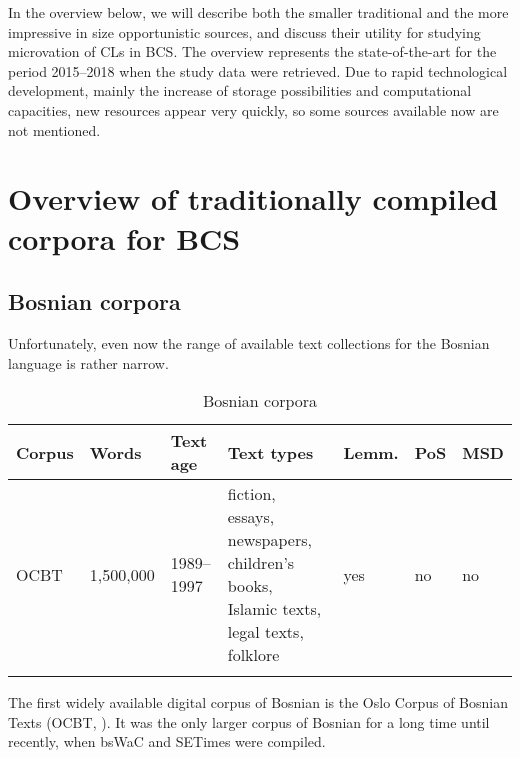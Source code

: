 In the overview below, we will describe both the smaller traditional and the more impressive in size opportunistic sources, and discuss their utility for studying microvation of CLs in BCS. The overview represents the state-of-the-art for the period 2015--2018 when the study data were retrieved. Due to rapid technological development, mainly the increase of storage possibilities and computational capacities, new resources appear very quickly, so some sources available now are not mentioned.

\section{Overview of traditionally compiled corpora for BCS}
\label{Overview of traditionally compiled corpora for BCS}
\subsection{Bosnian corpora}

Unfortunately, even now the range of available text collections for the Bosnian language is rather narrow. 

\begin{table}
\caption{Bosnian corpora}
\label{table:bos1}
\centering
\begin{tabularx}{.97\textwidth}{lll>{\raggedright\arraybackslash}Xlll}
\lsptoprule
Corpus	&	Words		&	Text age	&	Text types												&	Lemm.		&	PoS	&	MSD \\
\midrule
OCBT		&	1,500,000	&	1989--1997		&fiction, essays, newspapers, children's books, Islamic texts, legal texts, folklore 	&	yes	&	no	&	no\\
\lspbottomrule
\end{tabularx}
\end{table}

The first widely available digital corpus of Bosnian is the Oslo Corpus of Bosnian Texts (OCBT, \citealt{Santos98}). It was the only larger corpus of Bosnian for a long time until recently, when bsWaC and SETimes \citep[30]{LjubesicKlubicka14} were compiled. 

